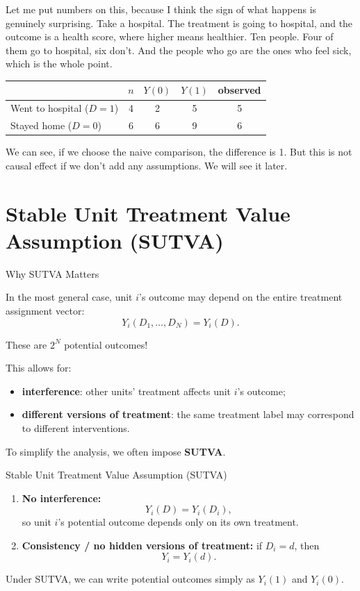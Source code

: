 \documentclass[11pt,aspectratio=169]{beamer}
\begin{document}
\begin{frame}{}
Let me put numbers on this, because I think the sign of what happens is genuinely surprising. 
Take a hospital. The treatment is going to hospital, and the outcome is a health score, where higher means healthier. 
Ten people. Four of them go to hospital, six don't. And the people who go are the ones who feel sick, which is the whole point.

\begin{center}
\begin{tabular}{lcccc}
\hline
& $n$ & $Y(0)$ & $Y(1)$ & observed \\
\hline
Went to hospital ($D=1$) & 4 & 2 & 5 & 5 \\
Stayed home ($D=0$) & 6 & 6 & 9 & 6 \\
\hline
\end{tabular}
\end{center}

We can see, if we choose the naive comparison, the difference is 1. But this is not causal effect if we don't add any assumptions. We will see it later.

\end{frame}




\section{Stable Unit Treatment Value Assumption (SUTVA)}

\begin{frame}{Why SUTVA Matters}


In the most general case, unit $i$'s outcome may depend on the entire treatment assignment vector:
$$Y_i(D_1, \dots, D_N) = Y_i(D).$$

These are $2^N$ potential outcomes!

This allows for:
\begin{itemize}
    \item \textbf{interference}: other units' treatment affects unit $i$'s outcome;
    \item \textbf{different versions of treatment}: the same treatment label may correspond to different interventions.
\end{itemize}

To simplify the analysis, we often impose \textbf{SUTVA}.
\end{frame}


\begin{frame}{Stable Unit Treatment Value Assumption (SUTVA)}


\begin{enumerate}
    \item \textbf{No interference:}
    $$Y_i(D) = Y_i(D_i),$$
    so unit $i$'s potential outcome depends only on its own treatment.
    \item \textbf{Consistency / no hidden versions of treatment:} if $D_i = d$, then
    $$Y_i = Y_i(d).$$
\end{enumerate}

Under SUTVA, we can write potential outcomes simply as $Y_i(1)$ and $Y_i(0)$.


\end{frame}
\end{document}
